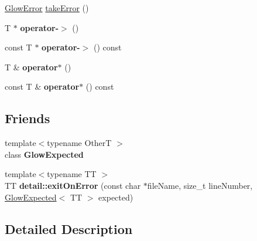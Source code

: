 \begin{DoxyCompactItemize}
\hyperlink{classglow_1_1detail_1_1_glow_error}{Glow\+Error} \hyperlink{classglow_1_1detail_1_1_glow_expected_a694628a1468d324f12b2ecd6d553797f}{take\+Error} ()
\item 
\mbox{\label{classglow_1_1detail_1_1_glow_expected_a17430386a9672441e0916b95670acb09}} 
T $\ast$ {\bfseries operator-\/$>$} ()
\item 
\mbox{\label{classglow_1_1detail_1_1_glow_expected_aeec9ce61bf53d271f617c7670c91fc33}} 
const T $\ast$ {\bfseries operator-\/$>$} () const
\item 
\mbox{\label{classglow_1_1detail_1_1_glow_expected_ad24c4006c3031859614de80350886169}} 
T \& {\bfseries operator$\ast$} ()
\item 
\mbox{\label{classglow_1_1detail_1_1_glow_expected_aa73faab12594ffda1409cd8824284752}} 
const T \& {\bfseries operator$\ast$} () const
\end{DoxyCompactItemize}
\subsection*{Friends}
\begin{DoxyCompactItemize}
\item 
\mbox{\label{classglow_1_1detail_1_1_glow_expected_a9be753e31f76569c0e7cff1031c7e6c1}} 
{\footnotesize template$<$typename OtherT $>$ }\\class {\bfseries Glow\+Expected}
\item 
\mbox{\label{classglow_1_1detail_1_1_glow_expected_a1472ffcb479db9fd31cfb0b4afe295af}} 
{\footnotesize template$<$typename TT $>$ }\\TT {\bfseries detail\+::exit\+On\+Error} (const char $\ast$file\+Name, size\+\_\+t line\+Number, \hyperlink{classglow_1_1detail_1_1_glow_expected}{Glow\+Expected}$<$ TT $>$ expected)
\end{DoxyCompactItemize}


\subsection{Detailed Description}
